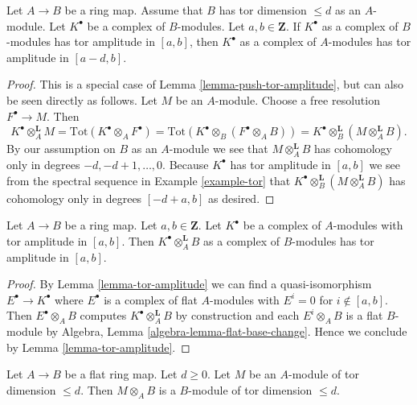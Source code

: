 \begin{lemma}
\label{lemma-finite-tor-dimension-push-tor-amplitude}
Let $A \to B$ be a ring map. Assume that $B$ has tor dimension $\leq d$
as an $A$-module. Let $K^\bullet$ be a complex of $B$-modules.
Let $a, b \in \mathbf{Z}$. If $K^\bullet$ as a complex of $B$-modules
has tor amplitude in $[a, b]$, then $K^\bullet$ as a complex of
$A$-modules has tor amplitude in $[a - d, b]$.
\end{lemma}

\begin{proof}
This is a special case of Lemma \ref{lemma-push-tor-amplitude}, but can also
be seen directly as follows.
Let $M$ be an $A$-module. Choose a free resolution $F^\bullet \to M$.
Then
$$
K^\bullet \otimes_A^{\mathbf{L}} M =
\text{Tot}(K^\bullet \otimes_A F^\bullet) =
\text{Tot}(K^\bullet \otimes_B (F^\bullet \otimes_A B)) =
K^\bullet \otimes_B^{\mathbf{L}} (M \otimes_A^{\mathbf{L}} B).
$$
By our assumption on $B$ as an $A$-module we see that
$M \otimes_A^{\mathbf{L}} B$ has cohomology only in degrees
$-d, -d + 1, \ldots, 0$. Because $K^\bullet$ has tor amplitude in
$[a, b]$ we see from the spectral sequence in
Example \ref{example-tor}
that $K^\bullet \otimes_B^{\mathbf{L}} (M \otimes_A^{\mathbf{L}} B)$
has cohomology only in degrees $[-d + a, b]$ as desired.
\end{proof}

\begin{lemma}
\label{lemma-pull-tor-amplitude}
Let $A \to B$ be a ring map.
Let $a, b \in \mathbf{Z}$.
Let $K^\bullet$ be a complex of $A$-modules with tor amplitude in $[a, b]$.
Then $K^\bullet \otimes_A^{\mathbf{L}} B$ as a complex of $B$-modules
has tor amplitude in $[a, b]$.
\end{lemma}

\begin{proof}
By
Lemma \ref{lemma-tor-amplitude}
we can find a quasi-isomorphism $E^\bullet \to K^\bullet$ where
$E^\bullet$ is a complex of flat $A$-modules with $E^i = 0$ for
$i \not \in [a, b]$. Then $E^\bullet \otimes_A B$ computes
$K^\bullet \otimes_A ^{\mathbf{L}} B$ by construction and
each $E^i \otimes_A B$ is a flat $B$-module by
Algebra, Lemma \ref{algebra-lemma-flat-base-change}.
Hence we conclude by
Lemma \ref{lemma-tor-amplitude}.
\end{proof}

\begin{lemma}
\label{lemma-flat-base-change-finite-tor-dimension}
Let $A \to B$ be a flat ring map. Let $d \geq 0$.
Let $M$ be an $A$-module of tor dimension $\leq d$.
Then $M \otimes_A B$ is a $B$-module of tor dimension $\leq d$.
\end{lemma}

